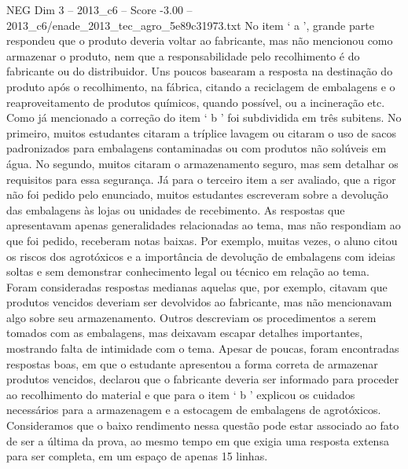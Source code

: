\begin{textsample}{NEG Dim 3 – 2013\_c6 – Score -3.00 – 2013\_c6/enade\_2013\_tec\_agro\_5e89c31973.txt}
No item ‘ a ’, grande parte respondeu que o produto deveria voltar ao fabricante, mas não mencionou como armazenar o produto, nem que a responsabilidade pelo recolhimento é do fabricante ou do distribuidor.
Uns poucos basearam a resposta na destinação do produto após o recolhimento, na fábrica, citando a reciclagem de embalagens e o reaproveitamento de produtos químicos, quando possível, ou a incineração etc.
Como já mencionado a correção do item ‘ b ’ foi subdividida em três subitens.
No primeiro, muitos estudantes citaram a tríplice lavagem ou citaram o uso de sacos padronizados para embalagens contaminadas ou com produtos não solúveis em água.
No segundo, muitos citaram o armazenamento seguro, mas sem detalhar os requisitos para essa segurança.
Já para o terceiro item a ser avaliado, que a rigor não foi pedido pelo enunciado, muitos estudantes escreveram sobre a devolução das embalagens às lojas ou unidades de recebimento.
As respostas que apresentavam apenas generalidades relacionadas ao tema, mas não respondiam ao que foi pedido, receberam notas baixas.
Por exemplo, muitas vezes, o aluno citou os riscos dos agrotóxicos e a importância de devolução de embalagens com ideias soltas e sem demonstrar conhecimento legal ou técnico em relação ao tema.
Foram consideradas respostas medianas aquelas que, por exemplo, citavam que produtos vencidos deveriam ser devolvidos ao fabricante, mas não mencionavam algo sobre seu armazenamento.
Outros descreviam os procedimentos a serem tomados com as embalagens, mas deixavam escapar detalhes importantes, mostrando falta de intimidade com o tema.
Apesar de poucas, foram encontradas respostas boas, em que o estudante apresentou a forma correta de armazenar produtos vencidos, declarou que o fabricante deveria ser informado para proceder ao recolhimento do material e que para o item ‘ b ’ explicou os cuidados necessários para a armazenagem e a estocagem de embalagens de agrotóxicos.
Consideramos que o baixo rendimento nessa questão pode estar associado ao fato de ser a última da prova, ao mesmo tempo em que exigia uma resposta extensa para ser completa, em um espaço de apenas 15 linhas.

\end{textsample}
